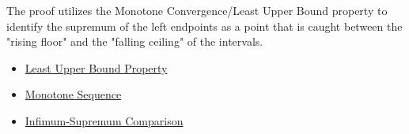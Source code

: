 \begin{remark*}
The proof utilizes the Monotone Convergence/Least Upper Bound property to identify the supremum of the left endpoints as a point that is caught between the "rising floor" and the "falling ceiling" of the intervals.
\end{remark*}

\begin{dependencies}
\begin{itemize}
  \item \hyperref[def:least-upper-bound-property]{Least Upper Bound Property}
  \item \hyperref[def:monotone-sequence]{Monotone Sequence}
  \item \hyperref[thm:infimum-supremum-comparison]{Infimum-Supremum Comparison}
\end{itemize}
\end{dependencies}

\clearpage

